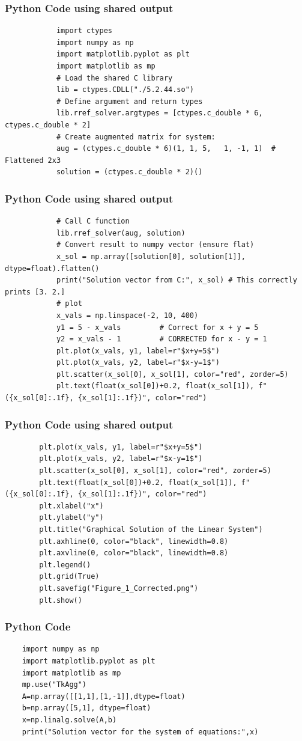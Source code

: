 \documentclass{beamer}
\begin{document}
	
	\begin{frame}[fragile]
		\frametitle{Python Code using shared output}
		\begin{lstlisting}
			import ctypes
			import numpy as np
			import matplotlib.pyplot as plt
			import matplotlib as mp
			# Load the shared C library
			lib = ctypes.CDLL("./5.2.44.so")
			# Define argument and return types
			lib.rref_solver.argtypes = [ctypes.c_double * 6, ctypes.c_double * 2]
			# Create augmented matrix for system:
			aug = (ctypes.c_double * 6)(1, 1, 5,   1, -1, 1)  # Flattened 2x3
			solution = (ctypes.c_double * 2)()
		\end{lstlisting}
	\end{frame}
	\begin{frame}[fragile]
		\frametitle{Python Code using shared output}
		\begin{lstlisting}		
			# Call C function
			lib.rref_solver(aug, solution)
			# Convert result to numpy vector (ensure flat)
			x_sol = np.array([solution[0], solution[1]], dtype=float).flatten()
			print("Solution vector from C:", x_sol) # This correctly prints [3. 2.]
			# plot
			x_vals = np.linspace(-2, 10, 400)
			y1 = 5 - x_vals         # Correct for x + y = 5
			y2 = x_vals - 1         # CORRECTED for x - y = 1
			plt.plot(x_vals, y1, label=r"$x+y=5$")
			plt.plot(x_vals, y2, label=r"$x-y=1$")
			plt.scatter(x_sol[0], x_sol[1], color="red", zorder=5)
			plt.text(float(x_sol[0])+0.2, float(x_sol[1]), f"({x_sol[0]:.1f}, {x_sol[1]:.1f})", color="red")
		\end{lstlisting}
	\end{frame}
	\begin{frame}[fragile]
		\frametitle{Python Code using shared output}
		\begin{lstlisting}
		plt.plot(x_vals, y1, label=r"$x+y=5$")
		plt.plot(x_vals, y2, label=r"$x-y=1$")
		plt.scatter(x_sol[0], x_sol[1], color="red", zorder=5)
		plt.text(float(x_sol[0])+0.2, float(x_sol[1]), f"({x_sol[0]:.1f}, {x_sol[1]:.1f})", color="red")
		plt.xlabel("x")
		plt.ylabel("y")
		plt.title("Graphical Solution of the Linear System")
		plt.axhline(0, color="black", linewidth=0.8)
		plt.axvline(0, color="black", linewidth=0.8)
		plt.legend()
		plt.grid(True)
		plt.savefig("Figure_1_Corrected.png")
		plt.show()
		\end{lstlisting}
	\end{frame}
	\begin{frame}[fragile]
		\frametitle{Python Code}
	\begin{lstlisting}
	import numpy as np
	import matplotlib.pyplot as plt
	import matplotlib as mp
	mp.use("TkAgg")
	A=np.array([[1,1],[1,-1]],dtype=float)
	b=np.array([5,1], dtype=float)
	x=np.linalg.solve(A,b)
	print("Solution vector for the system of equations:",x)
	\end{lstlisting}
	
\end{frame}
\end{document}
